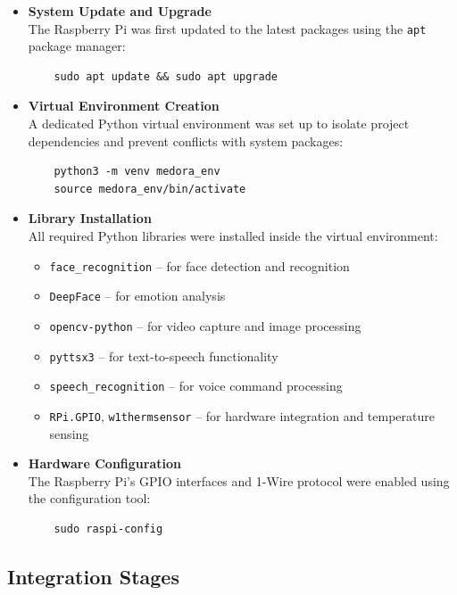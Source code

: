 \begin{itemize}
    \item \textbf{System Update and Upgrade} \\
    The Raspberry Pi was first updated to the latest packages using the \texttt{apt} 
    package manager:
    \begin{verbatim}
    sudo apt update && sudo apt upgrade
    \end{verbatim}

    \item \textbf{Virtual Environment Creation} \\
    A dedicated Python virtual environment was set up to isolate project dependencies 
    and prevent conflicts with system packages:
    \begin{verbatim}
    python3 -m venv medora_env
    source medora_env/bin/activate
    \end{verbatim}

    \item \textbf{Library Installation} \\
    All required Python libraries were installed inside the virtual environment:
    \begin{itemize}
        \item \texttt{face\_recognition} -- for face detection and recognition
        \item \texttt{DeepFace} -- for emotion analysis
        \item \texttt{opencv-python} -- for video capture and image processing
        \item \texttt{pyttsx3} -- for text-to-speech functionality
        \item \texttt{speech\_recognition} -- for voice command processing
        \item \texttt{RPi.GPIO}, \texttt{w1thermsensor} -- for hardware integration and temperature sensing
    \end{itemize}

    \item \textbf{Hardware Configuration} \\
    The Raspberry Pi’s GPIO interfaces and 1-Wire protocol were enabled using the configuration tool:
    \begin{verbatim}
    sudo raspi-config
    \end{verbatim}
\end{itemize}


\subsection*{Integration Stages}

